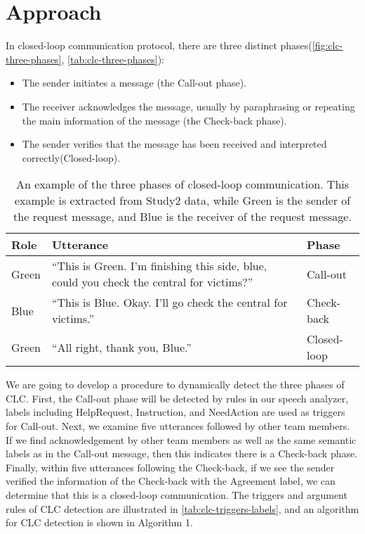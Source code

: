 \section{Approach}
In closed-loop communication protocol, there are three distinct phases\citep{Hargestam.ea:2013}(\autoref{fig:clc-three-phases}, \autoref{tab:clc-three-phases}): 
\begin{itemize}
    \item The sender initiates a message (the Call-out phase).
    \item The receiver acknowledges the message, usually by paraphrasing or repeating the main information of the message (the Check-back phase).
    \item The sender verifies that the message has been received and interpreted correctly(Closed-loop).
\end{itemize}


\begin{table*}[tb]
\centering
\begin{tabular}{lll}
    \toprule
    Role & Utterance & Phase \\\midrule
   Green & “This is Green. I’m finishing this side, blue, could you check the central for victims?” & Call-out\\
   Blue & “This is Blue. Okay. I’ll go check the central for victims.” & Check-back\\
   Green & “All right, thank you, Blue.” & Closed-loop\\
    \bottomrule
\end{tabular}
\caption{An example of the three phases of closed-loop communication. This example is extracted from Study2 data, while Green is the sender of the request message, and Blue is the receiver of the request message.}
\label{tab:clc-three-phases}
\end{table*}

We are going to develop a procedure to dynamically detect the three phases of CLC. First, the Call-out phase will be detected by rules in our speech analyzer, labels including HelpRequest, Instruction, and NeedAction are used as triggers for Call-out. Next, we examine five utterances followed by other team members. If we find acknowledgement by other team members as well as the same semantic labels as in the Call-out message, then this indicates there is a Check-back phase. Finally, within five utterances following the Check-back, if we see the sender verified the information of the Check-back with the Agreement label, we can determine that this is a closed-loop communication. The triggers and argument rules of CLC detection are illustrated in \autoref{tab:clc-triggers-labels}, and an algorithm for CLC detection is shown in Algorithm 1.

